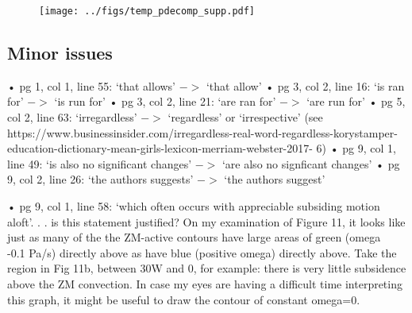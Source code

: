 \documentclass[12pt,oneside,a4paper]{article}%
\begin{document}
\begin{figure}[t]
\begin{center}
\noindent\texttt{[image: ../figs/temp\_pdecomp\_supp.pdf]}\\
\end{center}
\caption{\small}
\label{fig:supp}
\end{figure}

\subsection*{\small Minor issues}

• pg 1, col 1, line 55: ‘that allows’ $->$ ‘that allow’ \newline
• pg 3, col 2, line 16: ‘is ran for’ $->$ ‘is run for’ \newline
• pg 3, col 2, line 21: ‘are ran for’ $->$ ‘are run for’ \newline
• pg 5, col 2, line 63: ‘irregardless’ $->$ ‘regardless’ or ‘irrespective’ (see
https://www.businessinsider.com/irregardless-real-word-regardless-korystamper-
education-dictionary-mean-girls-lexicon-merriam-webster-2017-
6) \newline
• pg 9, col 1, line 49: ‘is also no significant changes’ $->$ ‘are also no signficant
changes’ \newline
• pg 9, col 2, line 26: ‘the authors suggests’ $->$ ‘the authors suggest’ \newline

{\color{red}{Thank you for pointing out these grammatical errors, they have been fixed. Irregardless flew right off my tongue and onto paper ... h/t for catching that. }} \newline

• pg 9, col 1, line 58: ‘which often occurs with appreciable subsiding motion
aloft’. . . is this statement justified? On my examination of Figure 11, it
looks like just as many of the the ZM-active contours have large areas of
green (omega ~ -0.1 Pa/s) directly above as have blue (positive omega)
directly above. Take the region in Fig 11b, between 30W and 0, for example:
there is very little subsidence above the ZM convection. In case my eyes
are having a difficult time interpreting this graph, it might be useful to
draw the contour of constant omega=0. \newline

{\color{red}{We have replaced the original plot to include the $\omega=0$ isoline. We believe the new plot justifies the original statement.}}
\end{document}
